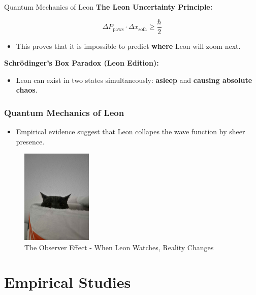 \documentclass[compress]{beamer}
\begin{document}
\begin{frame}{Quantum Mechanics of Leon}
    \textbf{The Leon Uncertainty Principle:}
    
    \begin{equation}
        \Delta P_{\text{paws}} \cdot \Delta x_{\text{sofa}} \geq \frac{\hbar}{2}
    \end{equation}
    
    \begin{itemize}
        \item This proves that it is impossible to predict \textbf{where} Leon will zoom next.
    \end{itemize}

    \textbf{Schrödinger’s Box Paradox (Leon Edition):}
    
    \begin{itemize}
        \item Leon can exist in two states simultaneously: \textbf{asleep} and \textbf{causing absolute chaos}.
    \end{itemize}
\end{frame}

\begin{frame}
\frametitle{Quantum Mechanics of Leon}
\begin{itemize}
  \item Empirical evidence suggest that Leon collapes the wave function by sheer presence.
\end{itemize}
\begin{center}
  \begin{figure}[h]
    \includegraphics[width=0.3\textwidth]{images/observer_leon.jpg} %
\caption{The Observer Effect - When Leon Watches, Reality Changes}
\label{fig:egypt_cat} %
  \end{figure}  

\end{center}
\end{frame}
\section{Empirical Studies}
\end{document}
